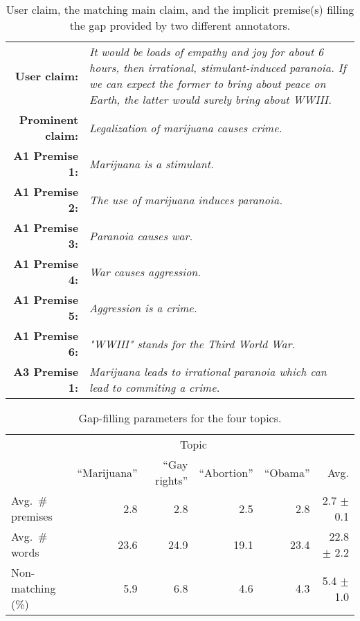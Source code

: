 \begin{table}[t!]
{\small
\begin{tabular}{@{\ }r@{\ \  }p{}}
\toprule
\textbf{User claim:} & \emph{It would be loads of empathy and joy for about 6
hours, then irrational, stimulant-induced paranoia. If we can expect the former
to bring about peace on Earth, the latter would surely bring about WWIII.}\\
\textbf{Prominent claim:} & \emph{Legalization of marijuana causes crime.}\\
\midrule
\textbf{A1 Premise 1:} & \emph{Marijuana is a stimulant.}\\
\textbf{A1 Premise 2:} & \emph{The use of marijuana induces paranoia.}\\
\textbf{A1 Premise 3:} & \emph{Paranoia causes war.}\\
\textbf{A1 Premise 4:} & \emph{War causes aggression.}\\
\textbf{A1 Premise 5:} & \emph{Aggression is a crime.}\\
\textbf{A1 Premise 6:} & \emph{"WWIII" stands for the Third World War.}\\
\midrule
\textbf{A3 Premise 1:} & \emph{Marijuana leads to irrational paranoia which can lead to commiting a crime.} \\
\bottomrule
\end{tabular}}
\caption{User claim, the matching main claim, and the implicit premise(s)
filling the gap provided by two different annotators.}
\label{tab:extreme_premisenumber}
\end{table}

\begin{table}
{\small
\begin{center}
\setlength{\tabcolsep}{4.2pt}
\begin{tabular}{@{}lrrrrr@{}}
\toprule
&\multicolumn{4}{c}{Topic}\\
\cmidrule(lr){2-5}
& ``Marijuana'' & ``Gay rights'' & ``Abortion'' & ``Obama'' & Avg. \\
\midrule
Avg.~\#\,premises  & 2.8  & 2.8   & 2.5   &  2.8  &  \phantom{0}2.7 $\pm$ 0.1 \\
Avg.~\#\,words     & 23.6  & 24.9   & 19.1   &  23.4  & 22.8 $\pm$ 2.2\\
Non-matching (\%)     & 5.9  & 6.8   & 4.6   &  4.3  &  \phantom{0}5.4 $\pm$ 1.0\\
\bottomrule
\end{tabular}
\caption{Gap-filling parameters for the four topics.}
\label{tab:var-topics}
\end{center}}
\end{table}

